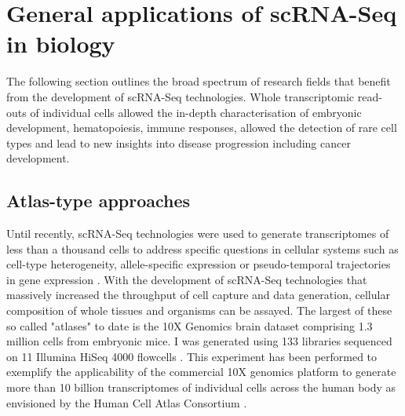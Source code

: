 
\section{General applications of scRNA-Seq in biology}

The following section outlines the broad spectrum of research fields that benefit from the development of scRNA-Seq technologies. Whole transcriptomic read-outs of individual cells allowed the in-depth characterisation of embryonic development, hematopoiesis, immune responses, allowed the detection of rare cell types and lead to new insights into disease progression including cancer development. 

\subsection{Atlas-type approaches}

Until recently, scRNA-Seq technologies were used to generate transcriptomes of less than a thousand cells to address specific questions in cellular systems such as cell-type heterogeneity, allele-specific expression or pseudo-temporal trajectories in gene expression \citep{Kolodziejczyk2015review}. With the development of scRNA-Seq technologies that massively increased the throughput of cell capture and data generation, cellular composition of whole tissues and organisms can be assayed. The largest of these so called "atlases" to date is the 10X Genomics\textsuperscript{\textregistered}{} brain dataset comprising 1.3 million cells from embryonic mice. I was generated using 133 libraries sequenced on 11 Illumina HiSeq\textsuperscript{\textregistered}{} 4000 flowcells \citep{Note2017}. This experiment has been performed to exemplify the applicability of the commercial 10X genomics platform to generate more than 10 billion transcriptomes of individual cells across the human body as envisioned by the Human Cell Atlas Consortium \citep{Regev2017}.\\

